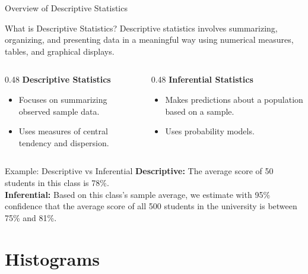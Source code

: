 \documentclass[10pt, aspectratio=169]{beamer}
\begin{document}
\begin{frame}{Overview of Descriptive Statistics}
    \begin{block}{What is Descriptive Statistics?}
        Descriptive statistics involves summarizing, organizing, and presenting data in a meaningful way using numerical measures, tables, and graphical displays.
    \end{block}

    \vspace{0.2cm}
    \begin{columns}[T]
        \begin{column}{0.48\textwidth}
            \textbf{Descriptive Statistics}
            \begin{itemize}
                \item Focuses on summarizing observed sample data.
                \item Uses measures of central tendency and dispersion.
            \end{itemize}
        \end{column}
        
        \begin{column}{0.48\textwidth}
            \textbf{Inferential Statistics}
            \begin{itemize}
                \item Makes predictions about a population based on a sample.
                \item Uses probability models.
            \end{itemize}
        \end{column}
    \end{columns}

    \begin{exampleblock}{Example: Descriptive vs Inferential}
        \textbf{Descriptive:} The average score of 50 students in this class is 78\%. \\
        \textbf{Inferential:} Based on this class's sample average, we estimate with 95\% confidence that the average score of all 500 students in the university is between 75\% and 81\%.
    \end{exampleblock}
\end{frame}

\section{Histograms}
\end{document}
